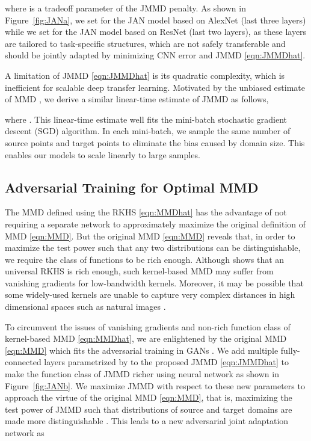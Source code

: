 \documentclass{article}
\begin{document}
where  is a tradeoff parameter of the JMMD penalty. As shown in Figure~\ref{fig:JANa}, we set  for the JAN model based on AlexNet (last three layers) while we set  for the JAN model based on ResNet (last two layers), as these layers are tailored to task-specific structures, which are not safely transferable and should be jointly adapted by minimizing CNN error and JMMD \eqref{eqn:JMMDhat}.

A limitation of JMMD \eqref{eqn:JMMDhat} is its quadratic complexity, which is inefficient for scalable deep transfer learning. Motivated by the unbiased estimate of MMD \cite{cite:JMLR12MMD}, we derive a similar linear-time estimate of JMMD as follows,

where . This linear-time estimate well fits the mini-batch stochastic gradient descent (SGD) algorithm. In each mini-batch, we sample the same number of source points and target points to eliminate the bias caused by domain size. This enables our models to scale linearly to large samples.

\subsection{Adversarial Training for Optimal MMD}
The MMD defined using the RKHS \eqref{eqn:MMDhat} has the advantage of not requiring a separate network to approximately maximize the original definition of MMD \eqref{eqn:MMD}. But the original MMD \eqref{eqn:MMD} reveals that, in order to maximize the test power such that any two distributions can be distinguishable, we require the class of functions  to be rich enough. Although \cite{cite:JMLR12MMD} shows that an universal RKHS is rich enough, such kernel-based MMD may suffer from vanishing gradients for low-bandwidth kernels. Moreover, it may be possible that some widely-used kernels are unable to capture very complex distances in high dimensional spaces such as natural images \cite{cite:AIS15MMD,cite:Arxiv17WGAN}. 

To circumvent the issues of vanishing gradients and non-rich function class of kernel-based MMD \eqref{eqn:MMDhat}, we are enlightened by the original MMD \eqref{eqn:MMD} which fits the adversarial training in GANs \cite{cite:NIPS14AdversarialNet}. We add multiple fully-connected layers parametrized by  to the proposed JMMD \eqref{eqn:JMMDhat} to make the function class of JMMD richer using neural network as shown in Figure~\ref{fig:JANb}. We maximize JMMD with respect to these new parameters  to approach the virtue of the original MMD \eqref{eqn:MMD}, that is, maximizing the test power of JMMD such that distributions of source and target domains are made more distinguishable \cite{cite:NIPS09KCC}. This leads to a new adversarial joint adaptation network as
\end{document}
